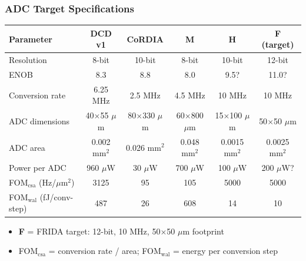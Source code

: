 \begin{frame}
  \frametitle{ADC Target Specifications}
  \begin{center}
    \small
    \begin{tabular}{l|ccccc}
      \hline
      \textbf{Parameter} & \textbf{DCD v1} & \textbf{CoRDIA} & \textbf{M} & \textbf{H} & \textbf{F (target)} \\
      \hline
      Resolution          & 8-bit       & 10-bit     & 8-bit      & 10-bit      & 12-bit      \\
      ENOB                & 8.3         & 8.8        & 8.0        & 9.5?        & 11.0?       \\
      Conversion rate     & 6.25 MHz    & 2.5 MHz    & 4.5 MHz    & 10 MHz      & 10 MHz      \\
      ADC dimensions      & 40$\times$55 $\mu$m & 80$\times$330 $\mu$m & 60$\times$800 $\mu$m & 15$\times$100 $\mu$m & 50$\times$50 $\mu$m \\
      ADC area            & 0.002 mm$^2$ & 0.026 mm$^2$ & 0.048 mm$^2$ & 0.0015 mm$^2$ & 0.0025 mm$^2$ \\
      Power per ADC       & 960 $\mu$W  & 30 $\mu$W  & 700 $\mu$W & 100 $\mu$W  & 200 $\mu$W? \\
      FOM$_{\mathrm{csa}}$ (Hz/$\mu$m$^2$) & 3125 & 95 & 105 & 5000 & 5000 \\
      FOM$_{\mathrm{wal}}$ (fJ/conv-step) & 487 & 26 & 608 & 14 & 10 \\
      \hline
    \end{tabular}
  \end{center}
  \vspace{0.5em}
  \begin{itemize}
    \item \textbf{F} = FRIDA target: 12-bit, 10 MHz, 50$\times$50 $\mu$m footprint
    \item FOM$_{\mathrm{csa}}$ = conversion rate / area; FOM$_{\mathrm{wal}}$ = energy per conversion step
  \end{itemize}
\end{frame}

